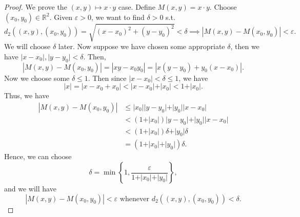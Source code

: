 \begin{proof}
    We prove the \((x, y) \mapsto x \cdot y\) case. Define \(M(x, y) = x \cdot y\). Choose \((x_0, y_0) \in \mathbb{R}^2 \). Given \(\varepsilon > 0\), we want to find \(\delta > 0\) s.t. 
    \[
        d_2 \left( (x, y), (x_0,y_0) \right) = \sqrt{(x - x_0)^2 + (y - y_0)^2}  < \delta \implies \left\vert M(x, y) - M(x_0, y_0) \right\vert < \varepsilon .  
    \] We will choose \(\delta \) later. Now suppose we have chosen some appropriate \(\delta \), then we have \(\vert x - x_0 \vert, \vert y - y_0 \vert < \delta  \). Then, 
    \[
        \left\vert M(x, y) - M(x_0, y_0) \right\vert = \left\vert xy - x_0 y_0 \right\vert = \left\vert x(y - y_0) + y_0(x - x_0) \right\vert. 
    \] Now we choose some \(\delta \le 1\). Then since \(\left\vert x - x_0 \right\vert < \delta \le 1\), we have
    \[
        \vert x \vert = \left\vert x - x_0 + x_0 \right\vert < \vert x - x_0 \vert + \vert x_0 \vert < 1 + \vert x_0 \vert.
    \] 
    Thus, we have 
    \begin{align*}
        \left\vert M(x, y) - M(x_0, y_0) \right\vert & \le \vert x_0 \vert  \vert y - y_0 \vert + \vert y_0 \vert \vert x - x_0 \vert  \\
        & < (1 + \vert x_0 \vert ) \vert y - y_0 \vert + \vert y_0 \vert \vert x - x_0 \vert \\
        &< (1 + \vert x_0 \vert )\delta + \vert y_0 \vert \delta  \\
        &= (1 + \vert x_0 \vert + \vert y_0 \vert  ) \delta.   
    \end{align*}
    Hence, we can choose 
    \[
        \delta = \min \left\{ 1, \frac{\varepsilon }{1 + \vert x_0 \vert + \vert y_0 \vert } \right\},
    \] and we will have 
    \[
        \left\vert M(x, y) - M(x_0, y_0) \right\vert < \varepsilon \text{ whenever } d_2 \left( (x, y), (x_0, y_0) \right) < \delta  .  
    \] 
\end{proof}
